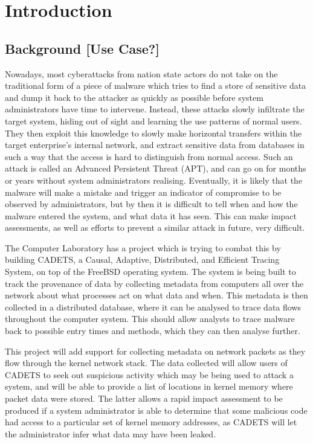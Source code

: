 \documentclass[a4paper,12pt,twoside,openright]{report}
\begin{document}
	
	\pagestyle{headings}
	
	\chapter{Introduction}
	
	\section{Background [Use Case?]}
	
	Nowadays, most cyberattacks from nation state actors do not take on the traditional form of a piece	of malware which tries to find a store of sensitive data and dump it back to the attacker as quickly as	possible before system administrators have time to intervene. Instead, these attacks slowly 	infiltrate the target system, hiding out of sight and learning the use patterns of normal users. They then exploit this knowledge to slowly make horizontal transfers within the target enterprise’s internal	network, and extract sensitive data from databases in such a way that the access is hard to	distinguish from normal access. Such an attack is called an Advanced Persistent Threat (APT), and can go on for months or years without system administrators realising. Eventually, it is likely that the malware will make a mistake and trigger an indicator of compromise to be observed by administrators, but by then it is difficult to tell when and how the malware entered the system, and what data it has seen. This can make impact assessments, as well as efforts to prevent a similar attack in future, very difficult.
	
	The Computer Laboratory has a project which is trying to combat this by building CADETS, a Causal, Adaptive, Distributed, and Efficient Tracing System, on top of the FreeBSD operating system. The system is being built to track the provenance of data by collecting metadata from computers all over the network about what processes act on what data and when. This metadata is then collected in a distributed database, where it can be analysed to trace data flows throughout the computer system. This should allow analysts to trace malware back to possible entry times and methods, which they can then analyse further.
	
	This project will add support for collecting metadata on network packets as they flow through the kernel	network stack. The data collected will allow users of CADETS to seek out suspicious activity which may be being used to attack a system, and will be able to provide a list of locations in kernel memory where packet data were stored. The latter allows a rapid impact assessment to be produced if a system administrator is able to determine that some malicious code had access to a particular set of kernel memory addresses, as CADETS will let the administrator infer what data may have been leaked.
	
\end{document}
